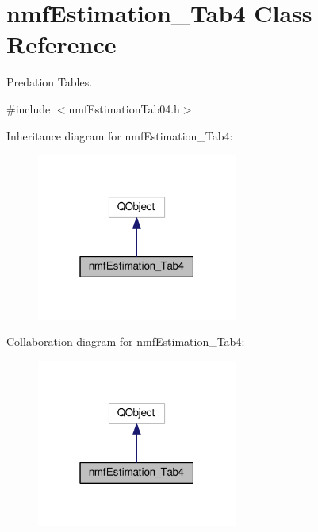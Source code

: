 \hypertarget{classnmf_estimation___tab4}{}\section{nmf\+Estimation\+\_\+\+Tab4 Class Reference}
\label{classnmf_estimation___tab4}


Predation Tables.  




{\ttfamily \#include $<$nmf\+Estimation\+Tab04.\+h$>$}



Inheritance diagram for nmf\+Estimation\+\_\+\+Tab4\+:\nopagebreak
\begin{figure}[H]
\begin{center}
\leavevmode
\includegraphics[width=187pt]{classnmf_estimation___tab4__inherit__graph}
\end{center}
\end{figure}


Collaboration diagram for nmf\+Estimation\+\_\+\+Tab4\+:\nopagebreak
\begin{figure}[H]
\begin{center}
\leavevmode
\includegraphics[width=187pt]{classnmf_estimation___tab4__coll__graph}
\end{center}
\end{figure}
